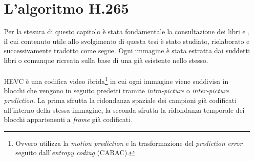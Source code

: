 
\chapter{L'algoritmo H.265} %
\label{Chapter4} %

Per la stesura di questo capitolo è stata fondamentale la consultazione dei
libri \citep{BookHEVC} e \citep{BookHEVC_2}, il cui contenuto utile allo 
svolgimento di questa tesi è stato studiato, rielaborato e successivamente 
tradotto come segue. Ogni immagine è stata estratta dai suddetti libri o 
comunque ricreata sulla base di una già esistente nello stesso.
\\ \\
HEVC è una codifica video ibrida\footnote{Ovvero utilizza la \emph{motion 
prediction} e la trasformazione del \emph{prediction error} seguito
dall'\emph{entropy coding} (CABAC).} in cui ogni immagine viene suddivisa in 
blocchi  che vengono in seguito predetti tramite \emph{intra-picture} o
\emph{inter-picture prediction}. La prima sfrutta la ridondanza spaziale dei
campioni già codificati all'interno della stessa immagine, la seconda sfrutta
la ridondanza temporale dei blocchi appartenenti a \emph{frame} già codificati.

